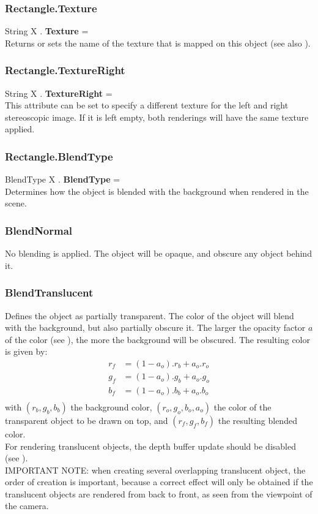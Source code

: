 \subsubsection{Rectangle.Texture \label{F:Rectangle:Texture}}
String X . \textbf{Texture} = \\
Returns or sets the name of the texture that is mapped on this object (see also ).

\subsubsection{Rectangle.TextureRight \label{F:Rectangle:TextureRight}}
String X . \textbf{TextureRight} = \\
This attribute can be set to specify a different texture for the left and right stereoscopic image. If it is left empty, both renderings will have the same texture applied.

\subsubsection{Rectangle.BlendType \label{F:Rectangle:BlendType}}
BlendType X . \textbf{BlendType} = \\
Determines how the object is blended with the background when rendered in the scene.

\subsubsection{BlendNormal \label{T:BlendType|BlendNormal}}
No blending is applied. The object will be opaque, and obscure any object behind it.

\subsubsection{BlendTranslucent \label{T:BlendType|BlendTranslucent}}
Defines the object as partially transparent. The color of the object will blend with the background, but also partially obscure it. The larger the opacity factor $a$ of the color (see ), the more the background will be obscured. The resulting color is given by:
\begin{equation}
\begin{array}{rcl}
r_f & = (1-a_o) . r_b + a_o . r_o \\
g_f & = (1-a_o) . g_b + a_o . g_o \\
b_f & = (1-a_o) . b_b + a_o . b_o \\
\end{array}
\end{equation}
with $(r_b,g_b,b_b)$ the background color, $(r_o,g_o,b_o,a_o)$ the color of the transparent object to be drawn on top, and $(r_f,g_f,b_f)$ the resulting blended color. \\
For rendering translucent objects, the depth buffer update should be disabled (see ). \\
IMPORTANT NOTE: when creating several overlapping translucent object, the order of creation is important, because a correct effect will only be obtained if the translucent objects are rendered from back to front, as seen from the viewpoint of the camera.


